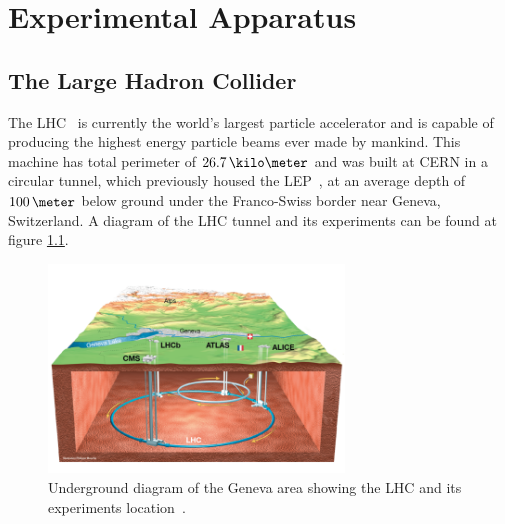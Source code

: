 \chapter{Experimental Apparatus}
\label{CHAPTER:ExperimentalApparatus}


\section{The Large Hadron Collider}
\label{SECTION:ExperimentalApparatus_LHC}


The \gls{LHC}~\cite{ARTICLE:LHCDesignReportVol1,ARTICLE:LHCMachine} is currently the world's largest particle accelerator and is capable of producing the highest energy particle beams ever made by mankind. This machine has total perimeter of $26.7\,\kilo\meter$ and was built at \gls{CERN} in a circular tunnel, which previously housed the \gls{LEP}~\cite{LEPTDR:LEPInjectorStudyGroup}, at an average depth of $100\,\meter$ below ground under the Franco-Swiss border near Geneva, Switzerland. A diagram of the \gls{LHC} tunnel and its experiments can be found at figure \ref{FIGURE:ExperimentalApparatus_LHCLayoutUnderground}.

\begin{figure}[!htb]
  \centering
  \includegraphics[width=0.70\textwidth]{Chapter02/LHC/Images/LHCUnderGroundDiagram.png}
  \caption{Underground diagram of the Geneva area showing the \gls{LHC} and its experiments location~\cite{IMAGEREF:LHCDiagram}.}
  \label{FIGURE:ExperimentalApparatus_LHCLayoutUnderground}
\end{figure}


